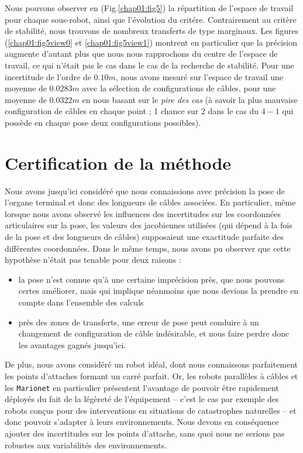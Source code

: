 Nous pouvons observer en (Fig.\ref{chap01:fig5}) la r\'epartition de l'espace 
de travail pour chaque sous-robot, ainsi que l'\'evolution du crit\'ere. 
Contrairement au crit\`ere de stabilit\'e, nous trouvons de nombreux transferts 
de type marginaux. Les figures (\ref{chap01:fig5view0} et 
\ref{chap01:fig5view1}) montrent en particulier que la pr\'ecision augmente 
d'autant plus que nous nous rapprochons du centre de l'espace de travail, ce qui 
n'\'etait pas le cas dans le cas de la recherche de stabilit\'e. Pour une 
incertitude de l'ordre de $0.10m$, nous avons mesur\'e sur l'espace de travail 
une moyenne de $0.0283m$ avec la s\'election de configurations de c\^ables, pour 
une moyenne de $0.0322m$ en nous basant sur le {\it pire des cas} (\`a savoir la 
plus mauvaise configuration de c\^ables en chaque point ; 1 chance sur 2 dans le 
cas du $4-1$ qui poss\`ede en chaque pose deux configurations possibles).

\section{Certification de la m\'ethode}

Nous avons jusqu'ici consid\'er\'e que nous connaissions avec pr\'ecision la 
pose de l'organe terminal et donc des longueurs de c\^ables associ\'ees. En 
particulier, m\^eme lorsque nous avons observ\'e les influences des 
incertitudes sur les coordonn\'ees articulaires sur la pose, les 
valeurs des jacobiennes utilis\'ees (qui d\'epend \`a la fois de la pose et des 
longueurs de c\^ables) supposaient une exactitude parfaite des diff\'erentes 
coordonn\'ees. Dans le m\^eme temps, nous avons pu observer que cette 
hypoth\`ese n'\'etait pas tenable pour deux raisons :
\begin{itemize}
 \item la pose n'est connue qu'\`a une certaine impr\'ecision pr\`es, que nous 
pouvons certes am\'eliorer, mais qui implique n\'eanmoins que nous devions la 
prendre en compte dans l'ensemble des calculs
\item pr\`es des zones de transferts, une erreur de pose peut conduire \`a un 
changement de configuration de c\^able ind\'esirable, et nous faire perdre donc 
les avantages gagn\'es jusqu'ici.
\end{itemize}

De plus, nous avons consid\'er\'e un robot id\'eal, dont nous connaissons 
parfaitement les points d'attaches formant un carr\'e parfait. Or, les robots 
parall\`eles \`a c\^ables et les {\tt Marionet} en particulier pr\'esentent 
l'avantage de pouvoir \^etre rapidement d\'eploy\'es du fait de la 
l\'eg\`eret\'e de l'\'equipement -- c'est le cas par exemple des robots con\c 
cus pour des interventions en situations de catastrophes naturelles -- et donc 
pouvoir s'adapter \`a leurs environnements. Nous devons en cons\'equence 
ajouter des incertitudes sur les points d'attache, sans quoi nous ne serions 
pas robustes aux variabilit\'es des environnements.


